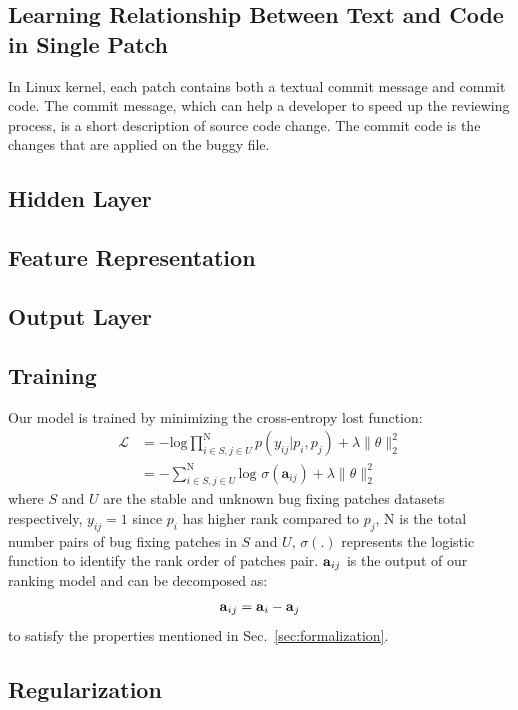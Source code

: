 \subsection{Learning Relationship Between Text and Code in Single Patch}
\label{sec:learningTextandCode}
In Linux kernel, each patch contains both a textual commit message and commit code. The commit message, which can help a developer to speed up the reviewing process, is a short description of source code change. The commit code is the changes that are applied on the buggy file. 


\subsection{Hidden Layer}
\label{sec:hiddenlayer}

\subsection{Feature Representation}
\label{sec:feature}

\subsection{Output Layer}
\label{sec:output}

\subsection{Training}
\label{sec:trainingmodel}
Our model is trained by minimizing the cross-entropy lost function: 
\begin{equation}
\begin{split}
	\mathcal{L} &= -\text{log}\prod^\text{N}_{i \in S,j \in U}p(y_{ij}|p_i,p_j) + \lambda \lVert \theta \lVert^2_2 \\ &= -\sum_{i \in S,j \in U}^\text{N} \text{log } \sigma (\textbf{a}_{ij}) + \lambda \lVert \theta \lVert^2_2
\end{split}
\end{equation}
where $S$ and $U$ are the stable and unknown bug fixing patches datasets respectively, $y_{ij} = 1$ since $p_i$ has higher rank compared to $p_j$, N is the total number pairs of bug fixing patches in $S$ and $U$, $\sigma(.)$ represents the logistic function to identify the rank order of patches pair. $\text{\textbf{a}}_{ij}$ is the output of our ranking model and can be decomposed as:
\begin{equation}
\begin{split}
\text{\textbf{a}}_{ij} & = \text{\textbf{a}}_i - \text{\textbf{a}}_{j} \\
\end{split}
\end{equation}
to satisfy the properties mentioned in Sec.~\ref{sec:formalization}. 

\subsection{Regularization}
\label{sec:regularization}




